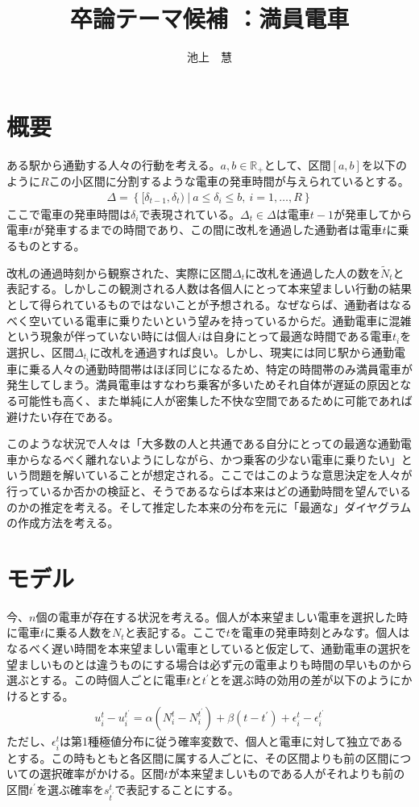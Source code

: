 \documentclass{jsarticle}
\begin{document}
\title{卒論テーマ候補 ：満員電車}
\author{池上　慧}
\maketitle

\section{概要}
ある駅から通勤する人々の行動を考える。$a,b\in \mathbb{R}_{+}$として、区間$[a, b]$を以下のように$R$この小区間に分割するような電車の発車時間が与えられているとする。
\begin{align*}
	\Delta = \left\{ [\delta_{t-1}, \delta_t)\ |\ a \leq \delta_i \leq b,\ i = 1, \dots, R \right\}
\end{align*}
ここで電車の発車時間は$\delta_i$で表現されている。$\Delta_t \in \Delta$は電車$t-1$が発車してから電車$t$が発車するまでの時間であり、この間に改札を通過した通勤者は電車$t$に乗るものとする。

改札の通過時刻から観察された、実際に区間$\Delta_t$に改札を通過した人の数を$\tilde{N}_t$と表記する。しかしこの観測される人数は各個人にとって本来望ましい行動の結果として得られているものではないことが予想される。なぜならば、通勤者はなるべく空いている電車に乗りたいという望みを持っているからだ。通勤電車に混雑という現象が伴っていない時には個人$i$は自身にとって最適な時間である電車$t_i$を選択し、区間$\Delta_{t_i}$に改札を通過すれば良い。しかし、現実には同じ駅から通勤電車に乗る人々の通勤時間帯はほぼ同じになるため、特定の時間帯のみ満員電車が発生してしまう。満員電車はすなわち乗客が多いためそれ自体が遅延の原因となる可能性も高く、また単純に人が密集した不快な空間であるために可能であれば避けたい存在である。

このような状況で人々は「大多数の人と共通である自分にとっての最適な通勤電車からなるべく離れないようにしながら、かつ乗客の少ない電車に乗りたい」という問題を解いていることが想定される。ここではこのような意思決定を人々が行っているか否かの検証と、そうであるならば本来はどの通勤時間を望んでいるのかの推定を考える。そして推定した本来の分布を元に「最適な」ダイヤグラムの作成方法を考える。

\section{モデル}
今、$n$個の電車が存在する状況を考える。個人が本来望ましい電車を選択した時に電車$t$に乗る人数を$N_t$と表記する。ここで$t$を電車の発車時刻とみなす。個人はなるべく遅い時間を本来望ましい電車としていると仮定して、通勤電車の選択を望ましいものとは違うものにする場合は必ず元の電車よりも時間の早いものから選ぶとする。この時個人ごとに電車$t$と$t^{'}$とを選ぶ時の効用の差が以下のようにかけるとする。
\begin{align*}
	u_i^t - u_i^{t^{'}} = \alpha(N_i^t - N_i^{t^{'}}) + \beta(t - t^{'}) + \epsilon_i^t - \epsilon_i^{t^{'}}
\end{align*}
ただし、$\epsilon_i^t$は第1種極値分布に従う確率変数で、個人と電車に対して独立であるとする。この時もともと各区間に属する人ごとに、その区間よりも前の区間についての選択確率がかける。区間$t$が本来望ましいものである人がそれよりも前の区間$t^{'}$を選ぶ確率を$s_{t^{'}}^t$で表記することにする。
\end{document}
